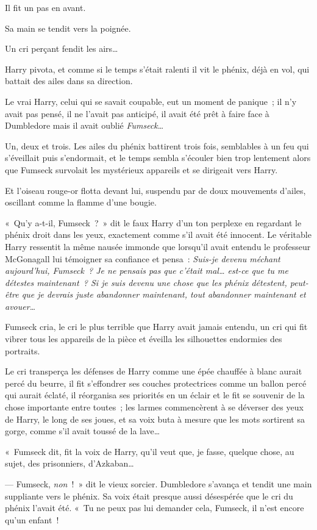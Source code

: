 Il fit un pas en avant.

Sa main se tendit vers la poignée.

Un cri perçant fendit les airs…

Harry pivota, et comme si le temps s'était ralenti il vit le phénix, déjà en vol, qui battait des ailes dans sa direction.

Le vrai Harry, celui qui se savait coupable, eut un moment de panique~; il n'y avait pas pensé, il ne l'avait pas anticipé, il avait été prêt à faire face à Dumbledore mais il avait oublié \emph{Fumseck}…

Un, deux et trois.
Les ailes du phénix battirent trois fois, semblables à un feu qui s'éveillait puis s'endormait, et le temps sembla s'écouler bien trop lentement alors que Fumseck survolait les mystérieux appareils et se dirigeait vers Harry.

Et l'oiseau rouge-or flotta devant lui, suspendu par de doux mouvements d'ailes, oscillant comme la flamme d'une bougie.

«~Qu'y a-t-il, Fumseck~?~»
dit le faux Harry d'un ton perplexe en regardant le phénix droit dans les yeux, exactement comme s'il avait été innocent.
Le véritable Harry ressentit la même nausée immonde que lorsqu'il avait entendu le professeur McGonagall lui témoigner sa confiance et pensa~: \emph{Suis-je devenu méchant aujourd'hui, Fumseck~?
Je ne pensais pas que c'était mal… est-ce que tu me détestes maintenant~?
Si je suis devenu une chose que les phénix détestent, peut-être que je devrais juste abandonner maintenant, tout abandonner maintenant et avouer…}

Fumseck cria, le cri le plus terrible que Harry avait jamais entendu, un cri qui fit vibrer tous les appareils de la pièce et éveilla les silhouettes endormies des portraits.

Le cri transperça les défenses de Harry comme une épée chauffée à blanc aurait percé du beurre, il fit s'effondrer ses couches protectrices comme un ballon percé qui aurait éclaté, il réorganisa ses priorités en un éclair et le fit se souvenir de la chose importante entre toutes~; les larmes commencèrent à se déverser des yeux de Harry, le long de ses joues, et sa voix buta à mesure que les mots sortirent sa gorge, comme s'il avait toussé de la lave…

«~Fumseck dit, fit la voix de Harry, qu'il veut que, je fasse, quelque chose, au sujet, des prisonniers, d'Azkaban…

--- Fumseck, \emph{non}~!~»
dit le vieux sorcier.
Dumbledore s'avança et tendit une main suppliante vers le phénix.
Sa voix était presque aussi désespérée que le cri du phénix l'avait été.
«~Tu ne peux pas lui demander cela, Fumseck, il n'est encore qu'un enfant~!

